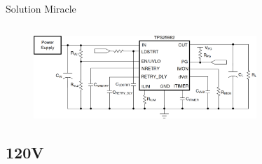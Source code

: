 \begin{frame}{Solution Miracle}
\begin{columns}
\begin{column}{0.66\textwidth}
        \end{column}
    \end{columns}
    \vfill
    \begin{figure}
        \centering
        \includegraphics[width=0.75\textwidth]{pictures/load-switch.png}
    \end{figure}
\end{frame}


\subsection{120V}

